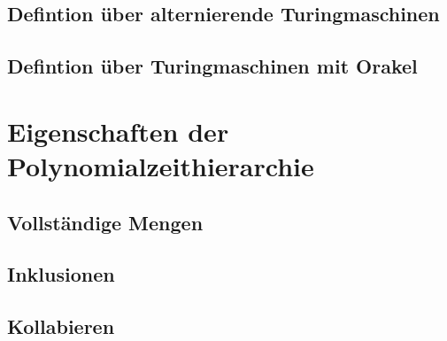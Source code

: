 \documentclass{beamer}
\begin{document}
\subsection{Defintion über alternierende Turingmaschinen}
\subsection{Defintion über Turingmaschinen mit Orakel}

\section{Eigenschaften der Polynomialzeithierarchie}
\subsection{Vollständige Mengen}
\subsection{Inklusionen}
\subsection{Kollabieren}
\end{document}
